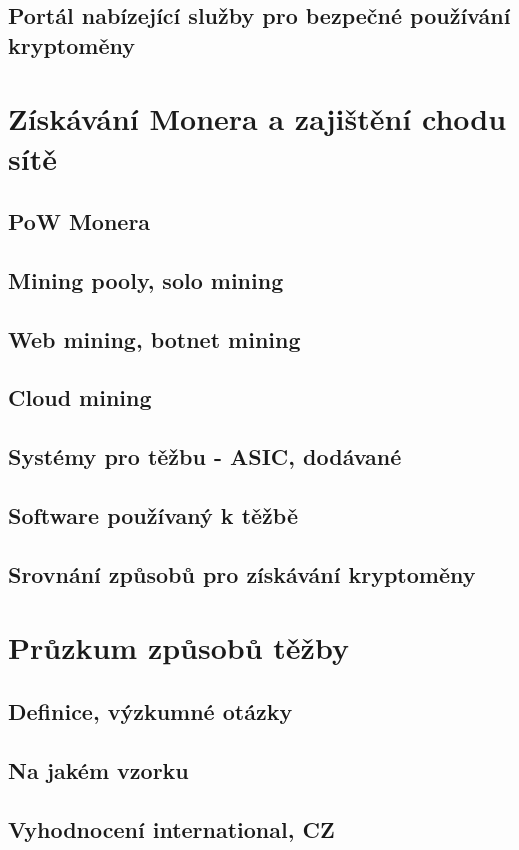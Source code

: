 \documentclass[
  printed, %
  table,   %
  nolof,     %
  nolot,     %
           oneside, color
]{fithesis3}
\begin{document}
\section{Portál nabízející služby pro bezpečné používání kryptoměny}



\chapter{Získávání Monera a zajištění chodu sítě}
\section{PoW Monera}
\section{Mining pooly, solo mining}
\section{Web mining, botnet mining}
\section{Cloud mining}
\section{Systémy pro těžbu - ASIC, dodávané}
\section{Software používaný k těžbě}
\section{Srovnání způsobů pro získávání kryptoměny}

\chapter{Průzkum způsobů těžby}
\section{Definice, výzkumné otázky}
\section{Na jakém vzorku}
\section{Vyhodnocení international, CZ}
\end{document}
